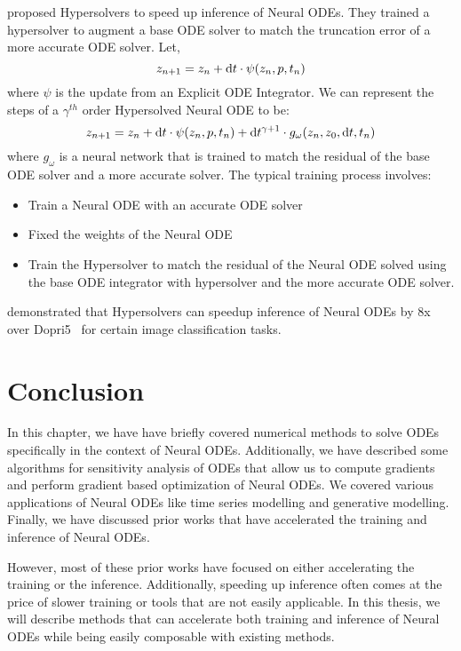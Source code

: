 \citet{poli2020hypersolvers} proposed Hypersolvers to speed up inference of Neural ODEs. They trained a hypersolver to augment a base ODE solver to match the truncation error of a more accurate ODE solver. Let,
%
\begin{equation}
  z_{n + 1} = z_n + \mathrm{d}t \cdot \psi(z_n, p, t_n)
\end{equation}
%
where $\psi$ is the update from an Explicit ODE Integrator. We can represent the steps of a $\gamma^{th}$ order Hypersolved Neural ODE to be:
%
\begin{equation}
  z_{n + 1} = z_n + \mathrm{d}t \cdot \psi(z_n, p, t_n) + \mathrm{d}t^{\gamma + 1} \cdot g_\omega(z_n, z_0, \mathrm{d}t, t_n)
\end{equation}
%
where $g_\omega$ is a neural network that is trained to match the residual of the base ODE solver and a more accurate solver. The typical training process involves:
%
\begin{itemize}
  \item Train a Neural ODE with an accurate ODE solver
  \item Fixed the weights of the Neural ODE
  \item Train the Hypersolver to match the residual of the Neural ODE solved using the base ODE integrator with hypersolver and the more accurate ODE solver.
\end{itemize}
%
\citet{poli2020hypersolvers} demonstrated that Hypersolvers can speedup inference of Neural ODEs by 8x over Dopri5~\citep{dormand1980family} for certain image classification tasks.

\section{Conclusion}
\label{sec:discussion_neural_ode}

In this chapter, we have have briefly covered numerical methods to solve ODEs specifically in the context of Neural ODEs. Additionally, we have described some algorithms for sensitivity analysis of ODEs that allow us to compute gradients and perform gradient based optimization of Neural ODEs. We covered various applications of Neural ODEs like time series modelling and generative modelling. Finally, we have discussed prior works that have accelerated the training and inference of Neural ODEs.

However, most of these prior works have focused on either accelerating the training or the inference. Additionally, speeding up inference often comes at the price of slower training or tools that are not easily applicable. In this thesis, we will describe methods that can accelerate both training and inference of Neural ODEs while being easily composable with existing methods.
